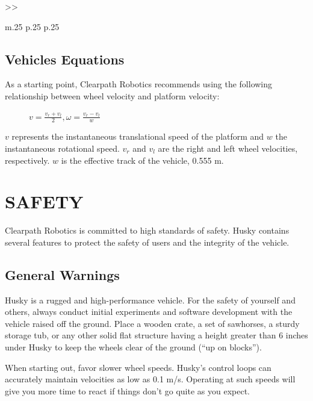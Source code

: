 \documentclass[]{clearpath-latex/clearpath-manual}
\begin{document}
\begin{table}[h]
\begin{tabular}{>{}>{\raggedright}m{.25\textwidth} p{.25\textwidth} p{.25\textwidth}}
	\end{tabular}
\newline
\caption{Husky A200 System Specifications}
\label{systemspecs}
\end{table}

\newpage
\subsection{Vehicles Equations}

As a starting point, Clearpath Robotics recommends using the following relationship between wheel velocity and platform velocity:
\begin{figure}[h]
\centering
$v=\frac{v_r+v_l}{2} , \omega=\frac{v_r-v_l}{w}$
\end{figure}

$v$ represents the instantaneous translational speed of the platform and $w$ the instantaneous rotational speed. $v_r$ and $v_l$ are
the right and left wheel velocities, respectively. $w$ is the effective track of the vehicle, 0.555 m.

\section{SAFETY}
Clearpath Robotics is committed to high standards of safety. Husky contains several features to protect the safety of users and the integrity of the vehicle.

\subsection{General Warnings}

Husky is a rugged and high-performance vehicle. For the safety of yourself and others, 
always conduct initial experiments and software development with the vehicle raised off the ground. 
Place a wooden crate, a set of sawhorses, a sturdy storage tub, or any other solid flat structure having a 
height greater than 6 inches under Husky to keep the wheels clear of the ground (“up on blocks”).

When starting out, favor slower wheel speeds. Husky’s control loops can accurately maintain velocities 
as low as 0.1 m/s. Operating at such speeds will give you more time to react if things don’t go quite as you expect.
\end{document}
